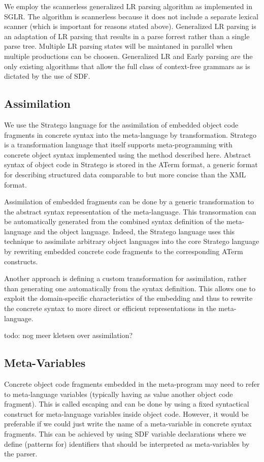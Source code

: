 \documentclass[a4paper,11pt]{article}
\begin{document}
We employ the scannerless generalized LR parsing algorithm as implemented in
SGLR. The algorithm is scannerless because it does not include a separate lexical
scanner (which is important for reasons stated above). Generalized LR parsing is
an adaptation of LR parsing that results in a parse forrest rather than a single
parse tree. Multiple LR parsing states will be maintaned in parallel when multiple
productions can be choosen. Generalized LR and Early parsing are the only existing
algorithms that allow the full class of context-free grammars as is dictated by
the use of SDF.


\subsection{Assimilation}

We use the Stratego language for the assimilation of embedded object code fragments
in concrete syntax into the meta-language by transformation. Stratego is a
transformation language that itself supports meta-programming with concrete object
syntax implemented using the method described here. Abstract syntax of object code
in Stratego is stored in the ATerm format, a generic format for describing
structured data comparable to but more concise than the XML format.

Assimilation of embedded fragments can be done by a generic transformation to the
abstract syntax representation of the meta-language. This transormation can be
automatically generated from the combined syntax definition of the meta-language
and the object language. Indeed, the Stratego language uses this technique to
assimilate arbitrary object languages into the core Stratego language by rewriting
embedded concrete code fragments to the corresponding ATerm constructs.

Another approach is defining a custom transformation for assimilation, rather than
generating one automatically from the syntax definition. This allows one to exploit
the domain-specific characteristics of the embedding and thus to rewrite the
concrete syntax to more direct or efficient representations in the meta-language.

todo: nog meer kletsen over assimilation?


\subsection{Meta-Variables}

Concrete object code fragments embedded in the meta-program may need to refer to
meta-language variables (typically having as value another object code fragment).
This is called escaping and can be done by using a fixed syntactical construct
for meta-language variables inside object code.
However, it would be preferable if we could just write the name of a meta-variable
in concrete syntax fragments. This can be achieved by using SDF variable
declarations where we define (patterns for) identifiers that should be interpreted
as meta-variables by the parser.
\end{document}
